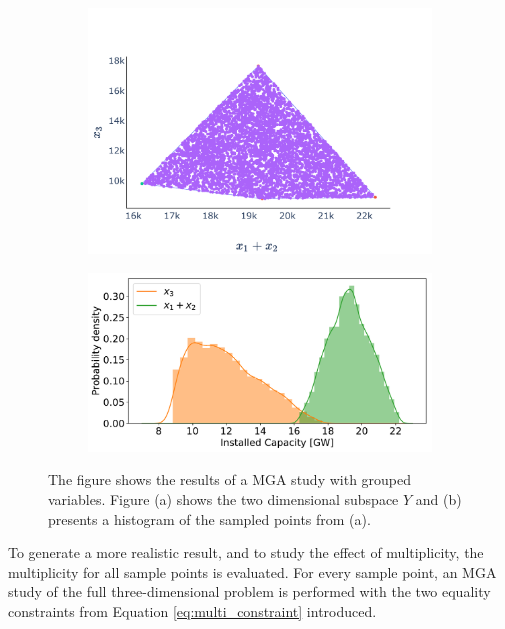 \begin{figure}[h]\centering
	\begin{subfigure}{.48\textwidth} \centering
		\includegraphics[width=1.\textwidth]{./Images/multi_1}
		\caption{}
		\label{fig:multi_1}
	\end{subfigure}
	\begin{subfigure}{.48\textwidth}  \centering
		\includegraphics[width=1.\textwidth]{./Images/multi_2}
		\caption{}
		\label{fig:multi_2}
	\end{subfigure}
	\caption{The figure shows the results of a MGA study with grouped variables. Figure (a) shows the two dimensional subspace $Y$ and (b) presents a histogram of the sampled points from (a). }
	\label{fig:multi_no_weights}
\end{figure}


To generate a more realistic result, and to study the effect of multiplicity, the multiplicity for all sample points is evaluated. For every sample point, an MGA study of the full three-dimensional problem is performed with the two equality constraints from Equation \ref{eq:multi_constraint} introduced.

